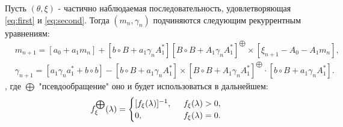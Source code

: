 \begin{theorem}\label{lost_minus_theor_1}
	Пусть $(\theta, \xi)$ - частично наблюдаемая последовательность, удовлетворяющая \eqref{eq:first} и \eqref{eq:second}. Тогда $(m_n, \gamma_n)$ подчиняются следующим рекуррентным уравнениям:
	\begin{align}
	\label{eq:seventh}
	& m_{n + 1} = [a_0 + a_1 m_n] + [b \circ B + a_1 \gamma_n A_1^*] [B \circ B + A_1 \gamma_n A_1^*]^{\bigoplus} \times [\xi_{n + 1} - A_0 - A_1 m_n],
	\end{align}
	\begin{align}
	\label{eq:eigth}
	& \gamma_{n + 1} = [a_1 \gamma_n a_1^*+ b \circ b] - [b \circ B + a_1 \gamma_n A_1^*] \times [B \circ B + A_1 \gamma_n A_1^*]^{\bigoplus} \cdot [b \circ B + a_1 \gamma_n A_1^*].
	\end{align}
	, где $\bigoplus$ "псевдообращение" оно и будет использоваться в дальнейшем:
	\begin{align*}
	f^{\bigoplus}_\xi (\lambda) = 
	\begin{cases}
	[f_\xi(\lambda)]^{-1}, \hspace{0.2cm} &f_\xi(\lambda) > 0, \\
	0, \hspace{0.2cm} &f_\xi(\lambda) = 0.
	\end{cases}
	\end{align*}
\end{theorem}
	
